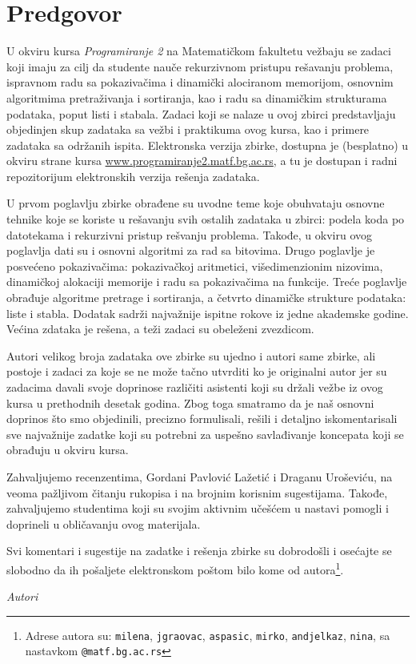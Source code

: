 
\chapter*{Predgovor}

U okviru kursa {\em Programiranje 2} na Matematičkom fakultetu vežbaju se zadaci 
koji imaju za cilj da studente nauče rekurzivnom pristupu rešavanju problema, 
ispravnom radu sa pokazivačima i dinamički alociranom memorijom, osnovnim algoritmima 
pretraživanja i sortiranja, kao i radu sa dinamičkim strukturama podataka, 
poput listi i stabala. Zadaci koji se nalaze u ovoj zbirci predstavljaju 
objedinjen skup zadataka sa vežbi i praktikuma ovog kursa, kao i primere 
zadataka sa održanih ispita. Elektronska verzija zbirke, dostupna je 
(besplatno) u okviru strane kursa \url{www.programiranje2.matf.bg.ac.rs}, 
a tu je dostupan i radni repozitorijum elektronskih verzija rešenja zadataka.

U prvom poglavlju zbirke obrađene su uvodne teme koje obuhvataju osnovne tehnike koje se koriste u rešavanju svih ostalih zadataka u zbirci: podela koda po datotekama i rekurzivni pristup rešvanju problema. Takođe, u okviru ovog poglavlja dati su i osnovni algoritmi za rad sa bitovima. Drugo poglavlje je posvećeno pokazivačima: pokazivačkoj aritmetici, višedimenzionim nizovima, dinamičkoj alokaciji memorije i radu sa pokazivačima na funkcije. Treće poglavlje obrađuje algoritme pretrage i sortiranja, a četvrto dinamičke strukture podataka: liste i stabla. Dodatak sadrži najvažnije ispitne rokove iz jedne akademske godine. Većina zdataka je rešena, a teži zadaci su obeleženi zvezdicom.


Autori velikog broja zadataka ove zbirke su ujedno i autori same zbirke, ali postoje 
i zadaci za koje se ne može tačno utvrditi ko je originalni autor jer su zadacima 
davali svoje doprinose različiti asistenti koji su držali vežbe iz ovog kursa u 
prethodnih desetak godina. Zbog toga smatramo da je naš osnovni doprinos 
što smo objedinili, precizno formulisali, rešili i detaljno iskomentarisali 
sve najvažnije zadatke koji su potrebni za uspešno savlađivanje koncepata 
koji se obrađuju u okviru kursa. 

\newpage
Zahvaljujemo recenzentima, Gordani Pavlović Lažetić i Draganu Uroševiću, na veoma pažljivom čitanju rukopisa i na brojnim korisnim sugestijama. Takođe, zahvaljujemo studentima koji su svojim aktivnim učešćem u nastavi pomogli i doprineli u obličavanju ovog materijala. 

Svi komentari i sugestije na zadatke i rešenja zbirke su dobrodošli i osećajte se slobodno da ih pošaljete elektronskom poštom bilo kome od autora\footnote{Adrese autora su: \texttt{milena}, \texttt{jgraovac}, \texttt{aspasic}, \texttt{mirko}, \texttt{andjelkaz}, \texttt{nina}, sa nastavkom \texttt{@matf.bg.ac.rs}}. 





\bigskip

\begin{flushright}
{\em Autori}
\end{flushright}
